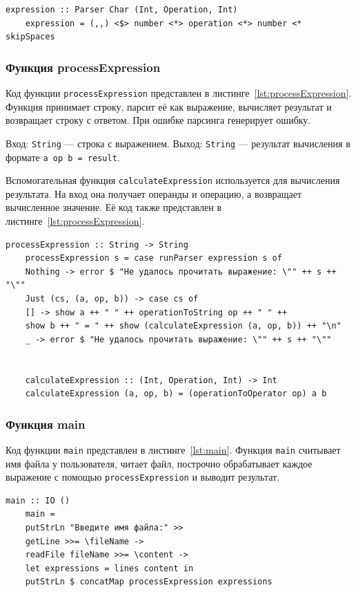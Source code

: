 \documentclass[a4paper, final]{article}
\begin{document}
\begin{lstlisting}[caption={Код функции expression}, label={lst:expression}]
	expression :: Parser Char (Int, Operation, Int)
	expression = (,,) <$> number <*> operation <*> number <* skipSpaces
\end{lstlisting}

\subsubsection{Функция processExpression}
Код функции \texttt{processExpression} представлен в листинге~\ref{lst:processExpression}.  
Функция принимает строку, парсит её как выражение, вычисляет результат и возвращает строку с ответом. При ошибке парсинга генерирует ошибку.

Вход: \texttt{String} — строка с выражением.  
Выход: \texttt{String} — результат вычисления в формате \texttt{a op b = result}.

Вспомогательная функция \texttt{calculateExpression} используется для вычисления результата. На вход она получает операнды и операцию, а возвращает вычисленное значение. Её код также представлен в листинге~\ref{lst:processExpression}.

\begin{lstlisting}[caption={Код функции processExpression}, label={lst:processExpression}]
	processExpression :: String -> String
	processExpression s = case runParser expression s of
	Nothing -> error $ "Не удалось прочитать выражение: \"" ++ s ++ "\""
	Just (cs, (a, op, b)) -> case cs of
	[] -> show a ++ " " ++ operationToString op ++ " " ++
	show b ++ " = " ++ show (calculateExpression (a, op, b)) ++ "\n"
	_ -> error $ "Не удалось прочитать выражение: \"" ++ s ++ "\""
	
	
	calculateExpression :: (Int, Operation, Int) -> Int
	calculateExpression (a, op, b) = (operationToOperator op) a b
\end{lstlisting}


\subsubsection{Функция main}
Код функции \texttt{main} представлен в листинге~\ref{lst:main}.  
Функция \texttt{main} считывает имя файла у пользователя, читает файл, построчно обрабатывает каждое выражение с помощью \texttt{processExpression} и выводит результат.

\begin{lstlisting}[caption={Код функции main}, label={lst:main}]
	main :: IO ()
	main =
	putStrLn "Введите имя файла:" >>
	getLine >>= \fileName ->
	readFile fileName >>= \content ->
	let expressions = lines content in
	putStrLn $ concatMap processExpression expressions
\end{lstlisting}
\end{document}
